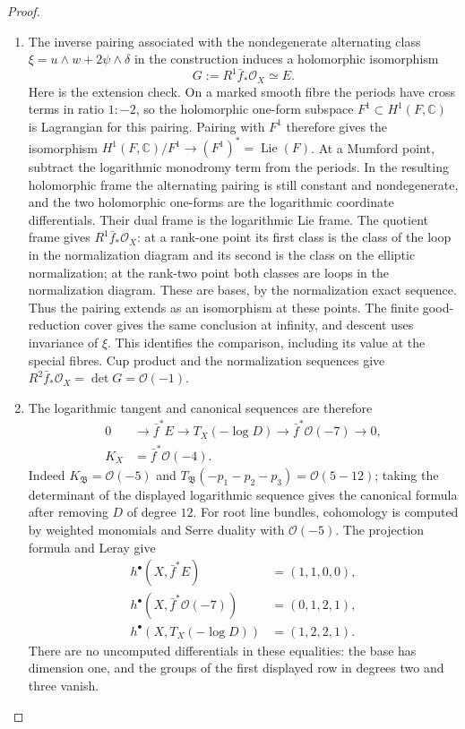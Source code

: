 \begin{proof}
\begin{enumerate}[label={$\langle1\rangle$\arabic*.},leftmargin=*]
\item The inverse pairing associated with the nondegenerate alternating
class $\xi=u\wedge w+2\psi\wedge\delta$ in the construction induces a
holomorphic isomorphism
\[
 G:=R^1\bar f_*\mathcal O_X\simeq E.
\]
Here is the extension check. On a marked smooth fibre the periods
have cross terms in ratio $1:-2$, so the holomorphic one-form
subspace $F^1\subset H^1(F,\mathbb C)$ is Lagrangian for this pairing.
Pairing with $F^1$ therefore gives the isomorphism
$H^1(F,\mathbb C)/F^1\to(F^1)^*=\operatorname{Lie}(F)$.
At a Mumford point, subtract the logarithmic monodromy term from the
periods. In the resulting holomorphic frame the alternating pairing
is still constant and nondegenerate, and the two holomorphic
one-forms are the logarithmic coordinate differentials. Their dual
frame is the logarithmic Lie frame. The quotient frame gives
$R^1\bar f_*\mathcal O_X$: at a rank-one point its first class is
the class of the loop in the normalization diagram and its second
is the class on the elliptic normalization; at the rank-two point
both classes are loops in the normalization diagram. These are
bases, by the normalization exact sequence. Thus the pairing extends
as an isomorphism at these points. The finite good-reduction cover
gives the same conclusion at infinity, and descent uses invariance
of $\xi$. This identifies the comparison, including its value at
the special fibres. Cup product and the normalization sequences
give $R^2\bar f_*\mathcal O_X=\det G=\mathcal O(-1)$.

\item The logarithmic tangent and canonical sequences are therefore
\[
\begin{split}
 0&\longrightarrow\bar f^*E\longrightarrow T_X(-\log D)
 \longrightarrow\bar f^*\mathcal O(-7)\longrightarrow0,\\
 K_X&=\bar f^*\mathcal O(-4).
\end{split}
\]
Indeed $K_{\mathfrak B}=\mathcal O(-5)$ and
$T_{\mathfrak B}(-p_1-p_2-p_3)=\mathcal O(5-12)$; taking the
determinant of the displayed logarithmic sequence gives the
canonical formula after removing $D$ of degree $12$.
For root line bundles, cohomology is computed by weighted monomials
and Serre duality with $\mathcal O(-5)$. The projection formula and
Leray give
\[
\begin{split}
 h^\bullet(X,\bar f^*E)&=(1,1,0,0),\\
 h^\bullet(X,\bar f^*\mathcal O(-7))&=(0,1,2,1),\\
 h^\bullet(X,T_X(-\log D))&=(1,2,2,1).
\end{split}
\]
There are no uncomputed differentials in these equalities: the base
has dimension one, and the groups of the first displayed row in
degrees two and three vanish.


\end{enumerate}
\end{proof}

